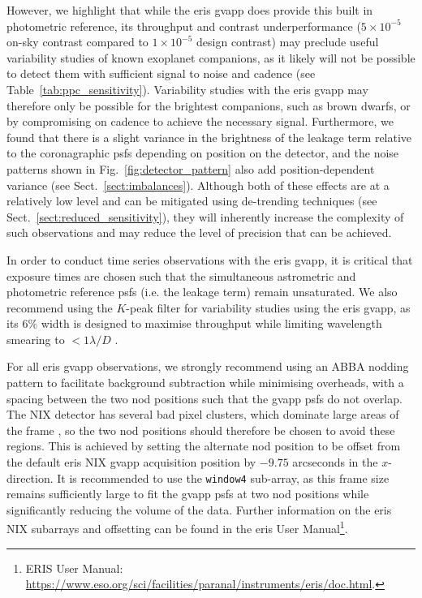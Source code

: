 \documentclass{aa}
\begin{document}
However, we highlight that while the \ac{eris} \ac{gvapp} does provide this built in photometric reference, its throughput and contrast underperformance ($5\times10^{-5}$ on-sky contrast compared to $1\times10^{-5}$ design contrast) may preclude useful variability studies of known exoplanet companions, as it likely will not be possible to detect them with sufficient signal to noise and cadence (see Table~\ref{tab:ppc_sensitivity}).
%
Variability studies with the \ac{eris} \ac{gvapp} may therefore only be possible for the brightest companions, such as brown dwarfs, or by compromising on cadence to achieve the necessary signal.
%
Furthermore, we found that there is a slight variance in the brightness of the leakage term relative to the coronagraphic \acp{psf} depending on position on the detector, and the noise patterns shown in Fig.~\ref{fig:detector_pattern} also add position-dependent variance (see Sect.~\ref{sect:imbalances}).
%
Although both of these effects are at a relatively low level and can be mitigated using de-trending techniques (see Sect.~\ref{sect:reduced_sensitivity}), they will inherently increase the complexity of such observations and may reduce the level of precision that can be achieved. 

In order to conduct time series observations with the \ac{eris} \ac{gvapp}, it is critical that exposure times are chosen such that the simultaneous astrometric and photometric reference \acp{psf} (i.e. the leakage term) remain unsaturated.
%
We also recommend using the $K$-peak filter for variability studies using the \ac{eris} \ac{gvapp}, as its 6\% width is designed to maximise throughput while limiting wavelength smearing to $<1\lambda/D$ \cite[see][]{2022MNRAS.515.5629D}.

For all \ac{eris} \ac{gvapp} observations, we strongly recommend using an ABBA nodding pattern to facilitate background subtraction while minimising overheads, with a spacing between the two nod positions such that the \ac{gvapp} \acp{psf} do not overlap.
%
The NIX detector has several bad pixel clusters, which dominate large areas of the frame \citep[e.g. see Fig. 2 in][]{2025A&A...698A..52M}, so the two nod positions should therefore be chosen to avoid these regions. 
%
This is achieved by setting the alternate nod position to be offset from the default \ac{eris} NIX \ac{gvapp} acquisition position by $-9.75$ arcseconds in the $x$-direction. 
%
It is recommended to use the \texttt{window4} sub-array, as this frame size remains sufficiently large to fit the \ac{gvapp} \acp{psf} at two nod positions while significantly reducing the volume of the data. 
%
Further information on the \ac{eris} NIX subarrays and offsetting can be found in the \ac{eris} User Manual\footnote{ERIS User Manual: \url{https://www.eso.org/sci/facilities/paranal/instruments/eris/doc.html}.}.
\end{document}
